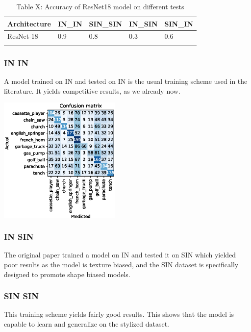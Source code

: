\documentclass{article}
\begin{document}
\begin{table}[h!]
  \begin{tabular}{lllll}
  \Xhline{2\arrayrulewidth}
  Architecture & IN\_IN & SIN\_SIN & IN\_SIN & SIN\_IN \\ \hline
  ResNet-18    & 0.9    & 0.8      & 0.3     & 0.6     \\ \Xhline{2\arrayrulewidth}
  \end{tabular}
  \caption{Table X: Accuracy of ResNet18 model on different tests}

\end{table}


\subsubsection{IN \texorpdfstring{\textrightarrow} .IN}
A model trained on IN and tested on IN is the usual training scheme used in the literature.
It yields competitive results, as we already now.

\includegraphics[width = 0.45\textwidth]{imgs/in/in-sin/in-sin_confusion_matrix_0.313.eps}


\subsubsection{IN \texorpdfstring{\textrightarrow} .SIN}
The original paper trained a model on IN and tested it on SIN which yielded poor results as 
the model is texture biased, and the SIN dataset is specifically designed to promote shape biased models.

\subsubsection{SIN \texorpdfstring{\textrightarrow} .SIN}
This training scheme yields fairly good results. This shows that the model is capable to learn
and generalize on the stylized dataset.
\end{document}
